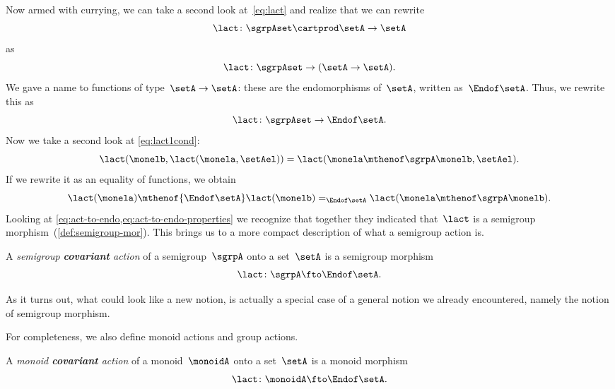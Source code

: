 Now armed with currying, we can take a second look at~\cref{eq:lact} and realize that we can rewrite
\begin{equation}
    \label{eq:currying-lact-1}
    \lact \colon \sgrpAset \cartprod \setA \to \setA
\end{equation}
as
\begin{equation}
    \label{eq:currying-lact-2}
    \lact \colon \sgrpAset \to (\setA \to \setA).
\end{equation}
%
We gave a name to functions of type~$\setA \to \setA$: these are the endomorphisms of~$\setA$, written as~$\Endof\setA$.
Thus, we rewrite this as
%
\begin{equation}
    \label{eq:act-to-endo}
    \lact \colon \sgrpAset \to \Endof\setA.
\end{equation}
%
Now we take a second look at \cref{eq:lact1cond}:
%
\begin{equation}
    \label{eq:lact1cond-2}
    \lact(\monelb, \lact(\monela, \setAel)) = \lact(\monela \mthenof\sgrpA \monelb, \setAel).
\end{equation}
%
If we rewrite it as an equality of functions, we obtain
%
\begin{equation}
    \label{eq:act-to-endo-properties}
    \lact(\monela) \mthenof{\Endof\setA}  \lact(\monelb) =_{\Endof\setA} \lact(\monela \mthenof\sgrpA \monelb).
\end{equation}
%
Looking at \cref{eq:act-to-endo,eq:act-to-endo-properties} we recognize that together they indicated that~$\lact$ is a semigroup morphism~(\cref{def:semigroup-mor}).
This brings us to a more compact description of what a semigroup action is.

\begin{ctdefinition}
    \label{def:semigroup-cov-action}
    A \emph{semigroup \textbf{covariant} action} of a semigroup~$\sgrpA$ onto a set~$\setA$ is a semigroup morphism
    \begin{equation}
        \label{eq:act-semigroup}
        \lact \colon \sgrpA \fto \Endof\setA.
    \end{equation}
\end{ctdefinition}

As it turns out, what could look like a new notion, is actually a special case of a general notion we already encountered, namely the notion of semigroup morphism.

For completeness, we also define monoid actions and group actions.

\begin{ctdefinition}
    \label{def:monoid-cov-action}
    A \emph{monoid \textbf{covariant} action} of a monoid~$\monoidA$ onto a set~$\setA$ is a monoid morphism
    \begin{equation}
        \label{eq:act-monoid}
        \lact \colon \monoidA \fto \Endof\setA.
    \end{equation}
\end{ctdefinition}

